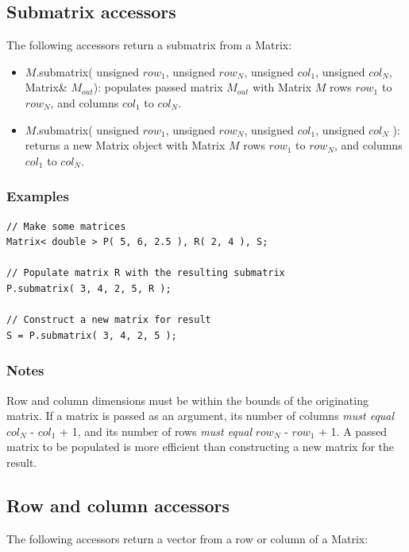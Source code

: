 \documentclass{report}
\begin{document}
\subsection{Submatrix accessors}

The following accessors return a submatrix from a Matrix:

\begin{itemize}
\item $M$.submatrix( unsigned $row_1$, unsigned $row_N$, unsigned
      $col_1$, unsigned $col_N$, Matrix\& $M_{out}$):
      populates passed matrix $M_{out}$ with Matrix $M$ rows $row_1$
      to $row_N$, and columns $col_1$ to $col_N$.
\item $M$.submatrix( unsigned $row_1$, unsigned $row_N$, unsigned
      $col_1$, unsigned $col_N$ ): returns a new Matrix object with
      Matrix $M$ rows $row_1$ to $row_N$, and columns $col_1$ to
      $col_N$.

\end{itemize}

\subsubsection{Examples}

\begin{verbatim}
// Make some matrices
Matrix< double > P( 5, 6, 2.5 ), R( 2, 4 ), S;

// Populate matrix R with the resulting submatrix
P.submatrix( 3, 4, 2, 5, R );

// Construct a new matrix for result
S = P.submatrix( 3, 4, 2, 5 );
\end{verbatim}

\subsubsection{Notes}
Row and column dimensions must be within the bounds of the originating
matrix.  If a matrix is passed as an argument, its number of columns
{\em must equal} $col_N$ - $col_1$ + 1, and its number of rows {\em
must equal} $row_N$ - $row_1$ + 1.  A passed matrix to be populated is
more efficient than constructing a new matrix for the result.

\subsection{Row and column accessors}

The following accessors return a vector from a row or column of a
Matrix:
\end{document}
